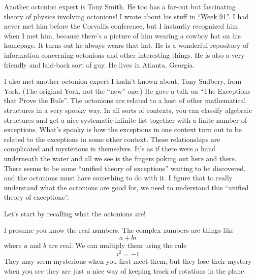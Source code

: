 \documentclass{article}
\begin{document}
Another octonion expert is Tony Smith. He too has a far-out but
fascinating theory of physics involving octonions! I wrote about his
stuff in \protect\hyperlink{week91}{``Week 91''}. I had never met him
before the Corvallis conference, but I instantly recognized him when I
met him, because there's a picture of him wearing a cowboy hat on his
homepage. It turns out he always wears that hat. He is a wonderful
repository of information concerning octonions and other interesting
things. He is also a very friendly and laid-back sort of guy. He lives
in Atlanta, Georgia.

I also met another octonion expert I hadn't known about, Tony Sudbery,
from York. (The original York, not the ``new'' one.) He gave a talk on
``The Exceptions that Prove the Rule''. The octonions are related to a
host of other mathematical structures in a very spooky way. In all sorts
of contexts, you can classify algebraic structures and get a nice
systematic infinite list together with a finite number of exceptions.
What's spooky is how the exceptions in one context turn out to be
related to the exceptions in some other context. These relationships are
complicated and mysterious in themselves. It's as if there were a hand
underneath the water and all we see is the fingers poking out here and
there. There seems to be some ``unified theory of exceptions'' waiting
to be discovered, and the octonions must have something to do with it. I
figure that to really understand what the octonions are good for, we
need to understand this ``unified theory of exceptions''.

Let's start by recalling what the octonions are!

I presume you know the real numbers. The complex numbers are things like
\[a + bi\] where \(a\) and \(b\) are real. We can multiply them using
the rule \[i^2 = -1\] They may seem mysterious when you first meet them,
but they lose their mystery when you see they are just a nice way of
keeping track of rotations in the plane.
\end{document}
